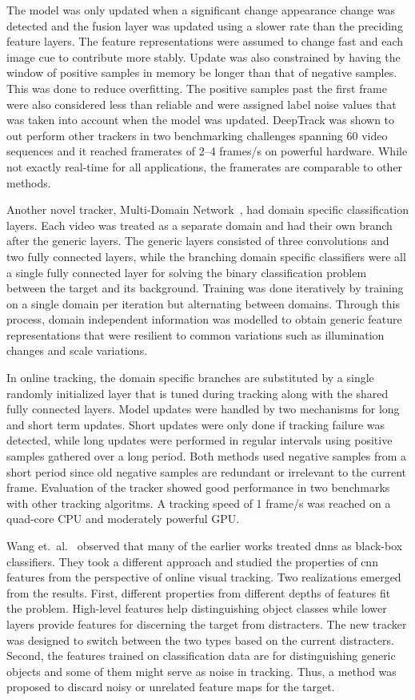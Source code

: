 The model was only updated when a significant change appearance change was detected
and the fusion layer was updated using a slower rate than the preciding feature layers.
The feature representations were assumed to change fast and each image cue to contribute
more stably. Update was also constrained by having the window of positive samples in
memory be longer than that of negative samples. This was done to reduce overfitting.
The positive samples past the first frame were also considered less than reliable and
were assigned label noise values that was taken into account when the model was updated.
DeepTrack was shown to out perform other trackers in two benchmarking challenges
spanning 60 video sequences and it reached framerates of 2--4 frames/s on powerful
hardware. While not exactly real-time for all applications, the framerates are comparable
to other methods.

Another novel tracker, Multi-Domain Network~\cite{MDNET}, had domain specific classification
layers. Each video was treated as a separate domain and had their own branch after the
generic layers. The generic layers consisted of three convolutions and two fully connected
layers, while the branching domain specific classifiers were all a single fully connected
layer for solving the binary classification problem between the target and its background.
Training was done iteratively by training on a single domain per iteration but alternating
between domains. Through this process, domain independent information was modelled to
obtain generic feature representations that were resilient to common variations such as
illumination changes and scale variations.

In online tracking, the domain specific branches are substituted by a single randomly
initialized layer that is tuned during tracking along with the shared fully connected
layers. Model updates were handled by two mechanisms for long and short term updates.
Short updates were only done if tracking failure was detected, while long updates
were performed in regular intervals using positive samples gathered over a long period.
Both methods used negative samples from a short period since old negative samples are
redundant or irrelevant to the current frame. Evaluation of the tracker showed good
performance in two benchmarks with other tracking algoritms. A tracking speed of
1 frame/s was reached on a quad-core CPU and moderately powerful GPU.

Wang et.~al.~\cite{FCN_TRACK_2} observed that many of the earlier works treated \ac{dnn}s
as black-box classifiers. They took a different approach and studied the properties of
\ac{cnn} features from the perspective of online visual tracking. Two realizations
emerged from the results. First, different properties from different depths of features
fit the problem. High-level features help distinguishing object classes while lower
layers provide features for discerning the target from distracters. The new tracker was
designed to switch between the two types based on the current distracters. Second, the
features trained on classification data are for distinguishing generic objects and some
of them might serve as noise in tracking. Thus, a method was proposed to discard noisy
or unrelated feature maps for the target.

